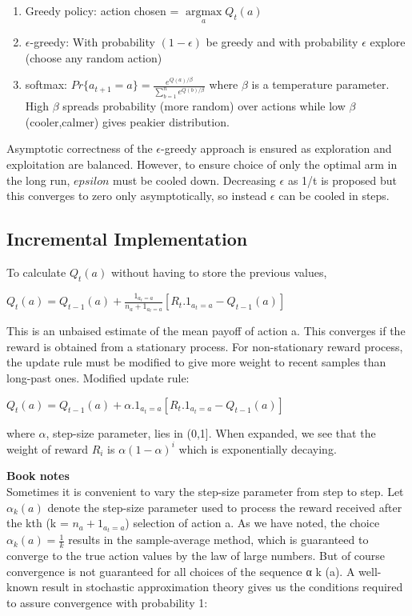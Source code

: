 \documentclass[a4paper]{article}
\newcommand{\argmaxF}{\mathop{\mathrm{argmax}}\limits}
\begin{document}
\begin{enumerate}
\item Greedy policy: action chosen = $\argmaxF_a Q_t(a)$ 
\item $\epsilon$-greedy: With probability $(1-\epsilon)$ be greedy and with probability $\epsilon$ explore (choose any random action)
\item softmax: $Pr\{a_{t+1}=a\} = \frac{e^{Q(a)/\beta}}{\sum_{b=1}^n e^{Q(b)/\beta}}$ where $\beta$ is a temperature parameter. High $\beta$ spreads probability (more random) over actions while low $\beta$ (cooler,calmer) gives peakier distribution.
\end{enumerate}

Asymptotic correctness of the $\epsilon$-greedy approach is ensured as exploration and exploitation are balanced. However, to ensure choice of only the optimal arm in the long run, $epsilon$ must be cooled down. Decreasing $\epsilon$ as 1/t is proposed but this converges to zero only asymptotically, so instead $\epsilon$ can be cooled in steps.

\subsection{Incremental Implementation}
To calculate $Q_t(a)$ without having to store the previous values,

$Q_t(a) = Q_{t-1}(a) + \frac{1_{a_t=a}}{n_a + 1_{a_t=a}}[R_t.1_{a_t=a} - Q_{t-1}(a)]$

This is an unbaised estimate of the mean payoff of action a. This converges if the reward is obtained from a stationary process. For non-stationary reward process, the update rule must be modified to give more weight to recent samples than long-past ones. Modified update rule:

$Q_t(a) = Q_{t-1}(a) + \alpha.1_{a_t=a}[R_t.1_{a_t=a} - Q_{t-1}(a)]$

where $\alpha$, step-size parameter, lies in (0,1]. When expanded, we see that the weight of reward $R_i$ is $\alpha(1-\alpha)^i$ which is exponentially decaying.

\textbf{Book notes}\\
Sometimes it is convenient to vary the step-size parameter from step to step. Let $\alpha_k(a)$ denote the step-size parameter used to process the reward received after the kth (k = $n_a + 1_{a_t=a}$) selection of action a. As we have noted, the choice $\alpha_k(a) = \frac{1}{k}$ results in the sample-average method, which is guaranteed to converge to the true action values by the law of large numbers. But of course convergence is not guaranteed for all choices of the sequence {α k (a)}. A well-known result in stochastic approximation theory gives us the conditions required to assure convergence with probability 1:
\end{document}
